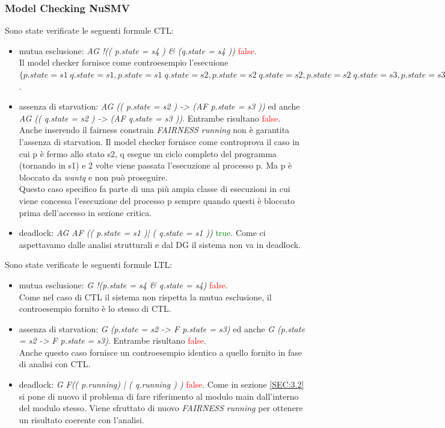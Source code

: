 \documentclass[a4paper]{article}
\begin{document}
\subsubsection{Model Checking NuSMV}
Sono state verificate le seguenti formule CTL:
\begin{itemize}
        \item mutua esclusione: \textit{AG !(( p.state = s4 ) \& (q.state = s4 ))} \textcolor{red}{false}.\\
		Il model checker fornisce come controesempio l'esecuione $\{p.state=s1\;q.state=s1,p.state=s1\;q.state=s2,p.state=s2\;q.state=s2,p.state=s2\;q.state=s3,p.state=s3\;q.state=s3,p.state=s3\;q.state=s4,p.state=s4\;q.state=s4\}$.
        \item assenza di starvation: \textit{AG (( p.state = s2 ) -> (AF p.state = s3 ))} ed anche \textit{AG (( q.state = s2 ) -> (AF q.state = s3 ))}. Entrambe risultano \textcolor{red}{false}.\\
		Anche inserendo il fairness constrain \textit{FAIRNESS running} non è garantita l'assenza di starvation. Il model checker fornisce come controprova il caso in cui p è fermo allo stato s2, q esegue un ciclo completo del programma (tornando in s1) e 2 volte viene passata l'esecuzione al processo p. Ma p è bloccato da \textit{wantq} e non può proseguire.\\
		Questo caso specifico fa parte di una più ampia classe di esecuzioni in cui viene concessa l'esecuzione del processo p sempre quando questi è bloccato prima dell'accesso in sezione critica.
        \item deadlock: \textit{AG AF (( p.state = s1 )| ( q.state = s1 ))} \textcolor{green}{true}. Come ci aspettavamo dalle analisi strutturali e dal DG il sistema non va in deadlock.
\end{itemize}
Sono state verificate le seguenti formule LTL:
\begin{itemize}
        \item mutua esclusione: \textit{G !(p.state = s4 \& q.state = s4)} \textcolor{red}{false}.\\
		Come nel caso di CTL il sistema non rispetta la mutua esclusione, il controesempio fornito è lo stesso di CTL.
        \item assenza di starvation: \textit{G (p.state = s2 ->  F p.state = s3)} ed anche \textit{G (p.state = s2 ->  F p.state = s3)}. Entrambe risultano \textcolor{red}{false}.\\
		Anche questo caso fornisce un controesempio identico a quello fornito in fase di analisi con CTL.
        \item deadlock: \textit{G F(( p.running) | ( q.running ) )} \textcolor{red}{false}. 
		Come in sezione \ref{SEC:3.2} si pone di nuovo il problema di fare riferimento al modulo main dall'interno del modulo stesso. Viene sfruttato di nuovo \textit{FAIRNESS running} per ottenere un risultato coerente con l'analisi.
\end{itemize}
\newpage
\end{document}
